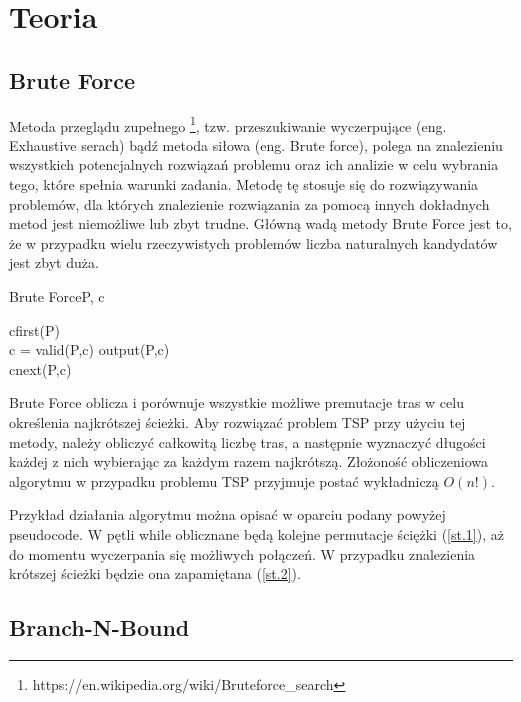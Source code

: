 \documentclass[a4paper,12pt]{article}
\begin{document}
\section{Teoria}
\subsection{Brute Force}
Metoda przeglądu zupełnego \footnote{https://en.wikipedia.org/wiki/Brute\-force\_search}, tzw. przeszukiwanie wyczerpujące (eng. Exhaustive serach) bądź
metoda siłowa (eng. Brute force), polega na znalezieniu wszystkich potencjalnych rozwiązań problemu 
oraz ich analizie w celu wybrania tego, które spełnia warunki zadania. Metodę tę stosuje się do 
rozwiązywania problemów, dla których znalezienie rozwiązania za pomocą innych dokładnych metod 
jest niemożliwe lub zbyt trudne. Główną wadą metody Brute Force jest to, że w przypadku wielu rzeczywistych problemów
liczba naturalnych kandydatów jest zbyt duża.

\begin{center}
    \begin{pseudocode}[ruled]{Brute Force}{P, c}
        
        c\GETS first(P)\\
        \WHILE c \not= \wedge
        \DO 
        \BEGIN
        \IF valid(P,c) \THEN output(P,c) 
        \\c\GETS next(P,c) 
        \END
    \end{pseudocode}
\end{center}

Brute Force oblicza i porównuje wszystkie możliwe premutacje tras w celu określenia 
najkrótszej ścieżki. Aby rozwiązać problem TSP przy użyciu tej metody, należy obliczyć 
całkowitą liczbę tras, a następnie wyznaczyć długości każdej z nich wybierając za każdym razem
najkrótszą. Złożoność obliczeniowa algorytmu w przypadku problemu TSP przyjmuje postać wykładniczą
$O(n!) $.
\newline

Przykład działania algorytmu można opisać w oparciu podany powyżej pseudocode.
W pętli while oblicznane będą kolejne permutacje ściężki (\ref{st.1}), aż do momentu 
wyczerpania się możliwych połączeń. W przypadku znalezienia krótszej ścieżki będzie ona
zapamiętana (\ref{st.2}).

\subsection{Branch-N-Bound}
\end{document}
